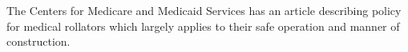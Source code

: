 \noindent The Centers for Medicare and Medicaid Services has an article describing policy for medical rollators which largely applies to their safe operation and manner of construction.